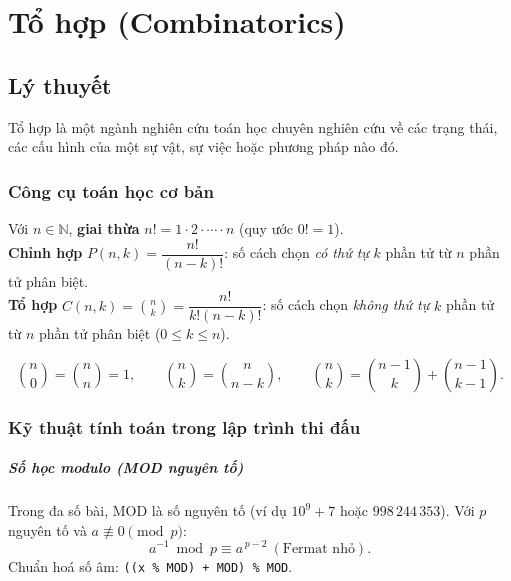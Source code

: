 \chapter{Tổ hợp (Combinatorics)}

\minitoc

\section{Lý thuyết}

Tổ hợp là một ngành nghiên cứu toán học chuyên nghiên cứu về các trạng thái, các cấu hình của một sự vật, sự việc hoặc phương pháp nào đó.

\subsection{Công cụ toán học cơ bản}
\label{subsec:comb-basic}

\begin{dinhnghia}
Với $n\in\mathbb{N}$, \textbf{giai thừa} $n! = 1\cdot 2\cdot \cdots \cdot n$ (quy ước $0!=1$).\\
\textbf{Chỉnh hợp} $P(n,k)=\dfrac{n!}{(n-k)!}$: số cách chọn \emph{có thứ tự} $k$ phần tử từ $n$ phần tử phân biệt.\\
\textbf{Tổ hợp} $C(n,k)=\binom{n}{k}=\dfrac{n!}{k!(n-k)!}$: số cách chọn \emph{không thứ tự} $k$ phần tử từ $n$ phần tử phân biệt ($0\le k\le n$).
\end{dinhnghia}

\begin{tinhchat}
\[
\binom{n}{0}=\binom{n}{n}=1,\qquad
\binom{n}{k}=\binom{n}{n-k},\qquad
\binom{n}{k}=\binom{n-1}{k}+\binom{n-1}{k-1}.
\]
\end{tinhchat}



\subsection{Kỹ thuật tính toán trong lập trình thi đấu}
\label{subsec:comb-impl}

\paragraph{Số học modulo (MOD nguyên tố)}
Trong đa số bài, MOD là số nguyên tố (ví dụ $10^9{+}7$ hoặc $998\,244\,353$). Với $p$ nguyên tố và $a\not\equiv 0\pmod p$:
\[
a^{-1}\bmod p \equiv a^{\,p-2}\ (\text{Fermat nhỏ}).
\]
Chuẩn hoá số âm: \texttt{((x \% MOD) + MOD) \% MOD}.

